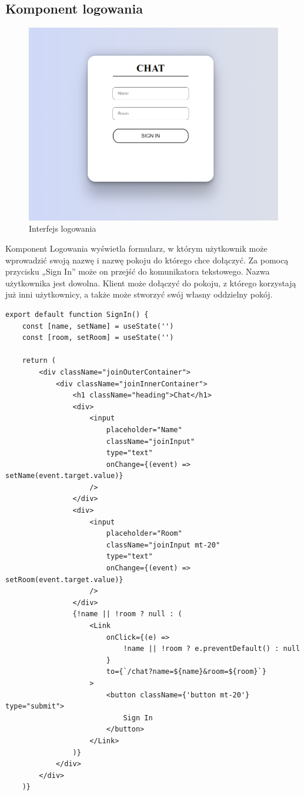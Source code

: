 \subsection{Komponent logowania}
\begin{figure}
	\centering
	\includegraphics[width=0.5\linewidth]{"obrazy/logowanie"}
	\caption{Interfejs logowania}
	\label{fig:7}
\end{figure}
Komponent Logowania wyświetla formularz, w którym użytkownik może wprowadzić swoją nazwę i nazwę pokoju do którego chce dołączyć. Za pomocą przycisku „Sign In” może on przejść do komunikatora tekstowego. Nazwa użytkownika jest dowolna. Klient może dołączyć do pokoju, z którego korzystają już inni użytkownicy, a także może stworzyć swój własny oddzielny pokój. 
\begin{lstlisting}[caption=Implementacja komponentu logowania ]
export default function SignIn() {
    const [name, setName] = useState('')
    const [room, setRoom] = useState('')

    return (
        <div className="joinOuterContainer">
            <div className="joinInnerContainer">
                <h1 className="heading">Chat</h1>
                <div>
                    <input
                        placeholder="Name"
                        className="joinInput"
                        type="text"
                        onChange={(event) => setName(event.target.value)}
                    />
                </div>
                <div>
                    <input
                        placeholder="Room"
                        className="joinInput mt-20"
                        type="text"
                        onChange={(event) => setRoom(event.target.value)}
                    />
                </div>
                {!name || !room ? null : (
                    <Link
                        onClick={(e) =>
                            !name || !room ? e.preventDefault() : null
                        }
                        to={`/chat?name=${name}&room=${room}`}
                    >
                        <button className={'button mt-20'} type="submit">
                            Sign In
                        </button>
                    </Link>
                )}
            </div>
        </div>
    )}
\end{lstlisting}

